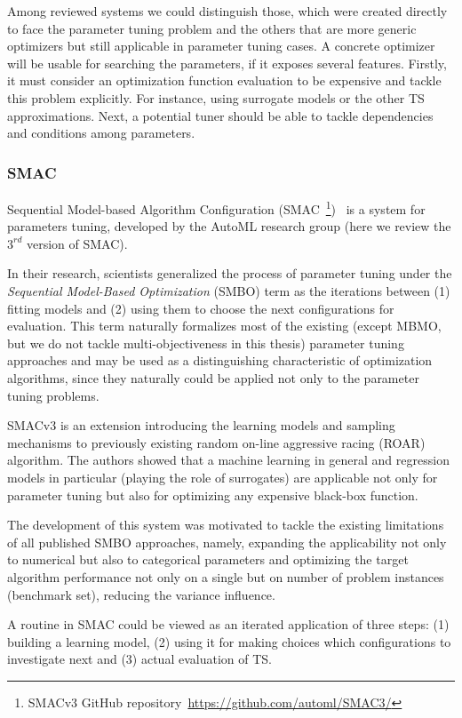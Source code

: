 Among reviewed systems we could distinguish those, which were created directly to face the parameter tuning problem and the others that are more generic optimizers but still applicable in parameter tuning cases.
A concrete optimizer will be usable for searching the parameters, if it exposes several features. Firstly, it must consider an optimization function evaluation to be expensive and tackle this problem explicitly. For instance, using surrogate models or the other TS approximations. Next, a potential tuner should be able to tackle dependencies and conditions among parameters.

\subsubsection{SMAC}\label{bg: smac}
Sequential Model-based Algorithm Configuration (SMAC~\footnote{SMACv3 GitHub repository~\url{https://github.com/automl/SMAC3/}})~\cite{hutter2011sequential} is a system for parameters tuning, developed by the AutoML research group (here we review the $3^{rd}$ version of SMAC). 

In their research, scientists generalized the process of parameter tuning under the  \emph{Sequential Model-Based Optimization} (SMBO) term as the iterations between (1) fitting models and (2) using them to choose the next configurations for evaluation. 
This term naturally formalizes most of the existing (except MBMO, but we do not tackle multi-objectiveness in this thesis) parameter tuning approaches and may be used as a distinguishing characteristic of optimization algorithms, since they naturally could be applied not only to the parameter tuning problems.

SMACv3 is an extension introducing the learning models and sampling mechanisms to previously existing random on-line aggressive racing (ROAR) algorithm. The authors showed that a machine learning in general and regression models in particular (playing the role of surrogates) are applicable not only for parameter tuning but also for optimizing any expensive black-box function. 

The development of this system was motivated to tackle the existing limitations of all published SMBO approaches, namely, expanding the applicability not only to numerical but also to categorical parameters and optimizing the target algorithm performance not only on a single but on number of problem instances (benchmark set), reducing the variance influence.

A routine in SMAC could be viewed as an iterated application of three steps: (1) building a learning model, (2) using it for making choices which configurations to investigate next and (3) actual evaluation of TS.

